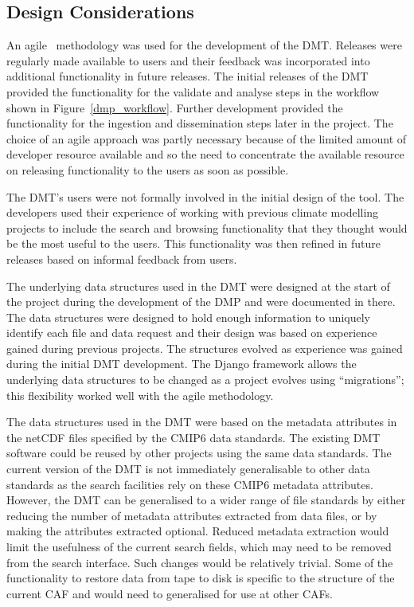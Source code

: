 \documentclass[gmd, manuscript]{copernicus}
\begin{document}
\subsection{Design Considerations}

An agile~\citep{beck2001agile} methodology was used for the development of the DMT. Releases were regularly made available to users and their feedback was incorporated into additional functionality in future releases. The initial releases of the DMT provided the functionality for the validate and analyse steps in the workflow shown in Figure~\ref{dmp_workflow}. Further development provided the functionality for the ingestion and dissemination steps later in the project. The choice of an agile approach was partly necessary because of the limited amount of developer resource available and so the need to concentrate the available resource on releasing functionality to the users as soon as possible. 

The DMT's users were not formally involved in the initial design of the tool. The developers used their experience of working with previous climate modelling projects to include the search and browsing functionality that they thought would be the most useful to the users. This functionality was then refined in future releases based on informal feedback from users. 

The underlying data structures used in the DMT were designed at the start of the project during the development of the DMP and were documented in there. The data structures were designed to hold enough information to uniquely identify each file and data request and their design was based on experience gained during previous projects. The structures evolved as experience was gained during the initial DMT development. The Django framework allows the underlying data structures to be changed as a project evolves using ``migrations''; this flexibility worked well with the agile methodology.

The data structures used in the DMT were based on the metadata attributes in the netCDF files specified by the CMIP6 data  standards. The existing DMT software could be reused by other projects using the same data standards. The current version of the DMT is not immediately generalisable to other data standards as the search facilities rely on these CMIP6 metadata attributes. However, the DMT can be generalised to a wider range of file standards by either reducing the number of metadata attributes extracted from data files, or by making the attributes extracted optional. Reduced metadata extraction would limit the usefulness of the current search fields, which may need to be removed from the search interface. Such changes would be relatively trivial. Some of the functionality to restore data from tape to disk is specific to the structure of the current CAF and would need to generalised for use at other CAFs.
\end{document}
